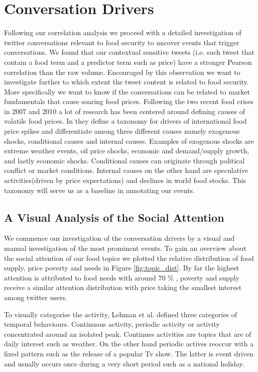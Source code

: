  \section{Conversation Drivers}
 \label{conversation}


Following our correlation analysis we proceed with a detailed investigation of twitter conversations relevant to food security to uncover events that trigger conversations. We found that our contextual sensitive tweets (i.e. such tweet that contain a food term and a predictor term such as price) have a stronger Pearson correlation than the raw volume. Encouraged by this observation we want to investigate further to which extent the tweet content is related to food security. More specifically we want to know if the conversations can be related to market fundamentals that cause soaring food prices. Following the two recent food crises in 2007 and 2010 a lot of research has been centered around defining causes of volatile food prices.  In \cite{Tadesse2014} they define a taxonomy for drivers of  international food price spikes and differentiate among three different causes namely exogenous shocks, conditional causes and internal causes. Examples of exogenous shocks are extreme weather events, oil price shocks, economic and demand/supply growth, and lastly economic shocks. Conditional causes can originate through political conflict or market conditions. Internal causes on the other hand are speculative activities(driven by price expectations) and declines in world food stocks. This taxonomy will serve us as a baseline in annotating our events. 



\subsection{A Visual Analysis of the Social Attention}

We commence our investigation of the conversation drivers by a visual and manual investigation of the most prominent events. To gain an overview about the social attention of our food topics we plotted the relative distribution of food supply, price poverty and needs in Figure \ref{fig:topic_dist}. By far the highest attention is attributed to food needs with around 70 \% , poverty and supply receive a similar attention distribution with price taking the smallest interest among twitter users. 

To visually categorise the activity, Lehman et al. \cite{Lehmann2012} defined three categories of temporal behaviours. Continuous activity, periodic activity or activity concentrated around an isolated peak. Continues activities are topics that are of daily interest such as weather. On the other hand periodic actives reoccur with a fixed pattern such as the release of a popular Tv show. The latter is event driven and usually occurs once during a very short period such as a national holiday. 

